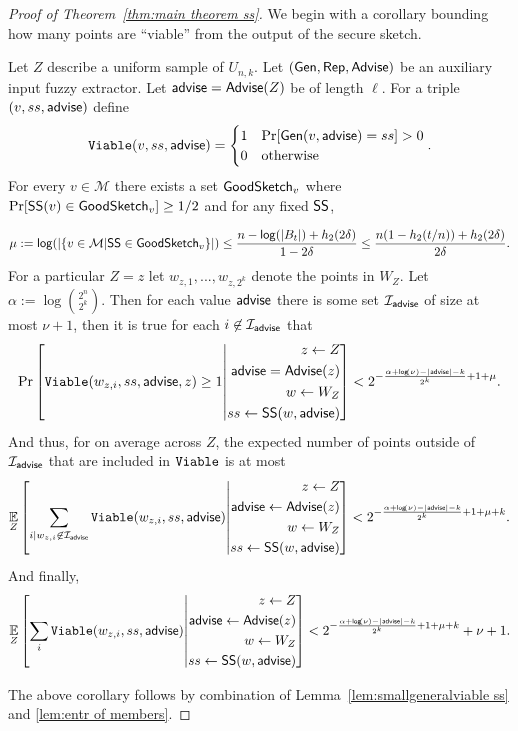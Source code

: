 \begin{proof}[Proof of Theorem~\ref{thm:main theorem ss}]
We begin with a corollary bounding how many points are ``viable'' from the output of the secure sketch.


\begin{corollary}
\label{corollary:info loss ss}
Let $Z$ describe a uniform sample of $U_{n,k}$.  Let $({\mathsf{Gen}}, {\mathsf{Rep}}, {\mathsf{Advise}})$ be an auxiliary input fuzzy extractor.  Let ${\mathsf{advise}} = {\mathsf{Advise}}(Z)$ be of length $\ell$.       For a triple $(v, ss, {\mathsf{advise}})$ define 
\[
\mathtt{Viable}(v, ss, {\mathsf{advise}}) = \begin{cases} 1& \Pr[{\mathsf{Gen}}(v, {\mathsf{advise}}) = ss]>0\\0&\text{otherwise}\end{cases}.\]
For every $v\in \mathcal{M}$ there exists a set $\mathsf{GoodSketch}_v$ where $\Pr[{\mathsf{SS}}(v)\in \mathsf{GoodSketch}_v] \ge 1/2$ and for any fixed ${\mathsf{SS}}$,
    
    \[
    \mu:=\mathsf{log}\!\left(|\{v \in \mathcal{M} | {\mathsf{SS}} \in \mathsf{GoodSketch}_v\}|\right) \le \frac{n - \mathsf{log}\!\left(|B_t|\right) +h_2(2\delta)}{1-2\delta} \le \frac{n(1-h_2(t/n)) +h_2(2\delta)}{2\delta}.
    \]
 For a particular $Z=z$ let $w_{z,1},..., w_{z,2^k}$ denote the points in $W_Z$. Let $\alpha:= \log {2^n\choose 2^k}$.  
 Then for each value ${\mathsf{advise}}$ there is some set $\mathcal{I}_{{\mathsf{advise}}}$ of size at most $\nu+1$, then it is true for each $i\not \in \mathcal{I}_{\mathsf{advise}}$ that
\[
\Pr\left[\mathtt{Viable}(w_{z,i},ss, {\mathsf{advise}}, z) \ge 1\middle| \begin{aligned} z\leftarrow Z\\ {\mathsf{advise}}= {\mathsf{Advise}}(z)\\w\leftarrow W_Z\\ss\leftarrow {\ensuremath{\mathsf{SS}}}(w, {\mathsf{advise}}) \end{aligned} \right]< 2^{-\frac{\alpha+\mathsf{log}\!\left(\nu\right)-|{\mathsf{advise}}|-k}{2^k}+1+\mu}.
\]
And thus, for on average across $Z$, the expected number of points outside of $\mathcal{I}_{\mathsf{advise}}$ that are included in $\mathtt{Viable}$ is at most 
\begin{align*}
\operatorname*{\mathbb{E}}_{Z} \left[\sum_{i | w_{z,i}\not\in\mathcal{I}_{\mathsf{advise}}} \mathtt{Viable}(w_{z,i}, ss, {\mathsf{advise}}) \middle| \begin{aligned} z\leftarrow Z\\ {\mathsf{advise}}\leftarrow {\ensuremath{\mathsf{Advise}}}(z)\\w\leftarrow W_Z\\ss\leftarrow {\ensuremath{\mathsf{SS}}}(w, {\mathsf{advise}})\end{aligned} \right]< 2^{-\frac{\alpha+\mathsf{log}\!\left(\nu\right) - |{\mathsf{advise}}|-k}{2^k}+1+\mu+k}.
\end{align*}
And finally, 
\begin{align*}
\operatorname*{\mathbb{E}}_{Z} \left[\sum_{i }  \mathtt{Viable}(w_{z,i}, ss, {\mathsf{advise}}) \middle| \begin{aligned} z\leftarrow Z\\ {\mathsf{advise}}\leftarrow {\ensuremath{\mathsf{Advise}}}(z)\\w\leftarrow W_Z\\ss\leftarrow {\ensuremath{\mathsf{SS}}}(w, {\mathsf{advise}})\end{aligned} \right]< 2^{-\frac{\alpha+\mathsf{log}\!\left(\nu\right)-|{\mathsf{advise}}|-k}{2^k}+1+\mu+k}+\nu+1.
\end{align*}
\end{corollary}
The above corollary follows by combination of Lemma~\ref{lem:smallgeneralviable ss} and \ref{lem:entr of members}.
\end{proof}
